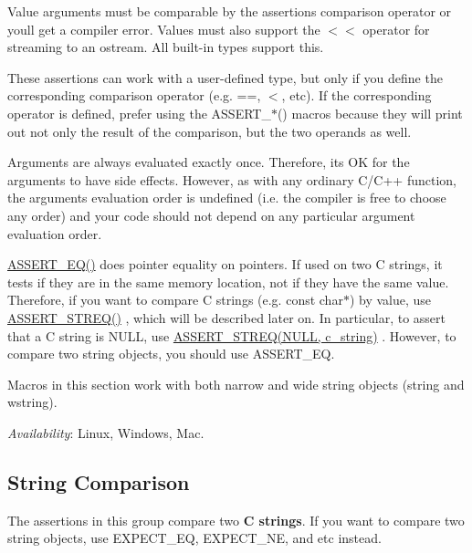 Value arguments must be comparable by the assertion\textquotesingle{}s comparison operator or you\textquotesingle{}ll get a compiler error. Values must also support the {\ttfamily $<$$<$} operator for streaming to an {\ttfamily ostream}. All built-\/in types support this.

These assertions can work with a user-\/defined type, but only if you define the corresponding comparison operator (e.\+g. {\ttfamily ==}, {\ttfamily $<$}, etc). If the corresponding operator is defined, prefer using the {\ttfamily A\+S\+S\+E\+R\+T\+\_\+$\ast$()} macros because they will print out not only the result of the comparison, but the two operands as well.

Arguments are always evaluated exactly once. Therefore, it\textquotesingle{}s OK for the arguments to have side effects. However, as with any ordinary C/\+C++ function, the arguments\textquotesingle{} evaluation order is undefined (i.\+e. the compiler is free to choose any order) and your code should not depend on any particular argument evaluation order.

{\ttfamily \hyperlink{gtest_8h_a1a6db8b1338ee7040329322b77779086}{A\+S\+S\+E\+R\+T\+\_\+\+E\+Q()}} does pointer equality on pointers. If used on two C strings, it tests if they are in the same memory location, not if they have the same value. Therefore, if you want to compare C strings (e.\+g. {\ttfamily const char$\ast$}) by value, use {\ttfamily \hyperlink{gtest_8h_a74f4189ea570bab9a65d47104659ef9c}{A\+S\+S\+E\+R\+T\+\_\+\+S\+T\+R\+E\+Q()}} , which will be described later on. In particular, to assert that a C string is {\ttfamily N\+U\+LL}, use {\ttfamily \hyperlink{gtest_8h_a74f4189ea570bab9a65d47104659ef9c}{A\+S\+S\+E\+R\+T\+\_\+\+S\+T\+R\+E\+Q(\+N\+U\+L\+L, c\+\_\+string)}} . However, to compare two {\ttfamily string} objects, you should use {\ttfamily A\+S\+S\+E\+R\+T\+\_\+\+EQ}.

Macros in this section work with both narrow and wide string objects ({\ttfamily string} and {\ttfamily wstring}).

{\itshape Availability}\+: Linux, Windows, Mac.

\subsection*{String Comparison}

The assertions in this group compare two {\bfseries C strings}. If you want to compare two {\ttfamily string} objects, use {\ttfamily E\+X\+P\+E\+C\+T\+\_\+\+EQ}, {\ttfamily E\+X\+P\+E\+C\+T\+\_\+\+NE}, and etc instead.

